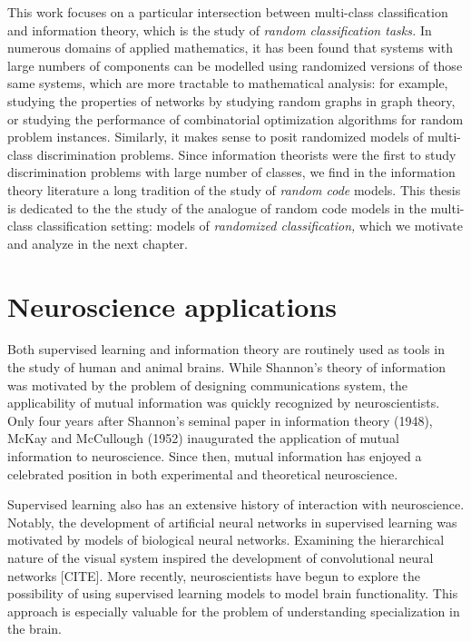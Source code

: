 This work focuses on a particular intersection between multi-class
classification and information theory, which is the study of
\emph{random classification tasks.}  In numerous domains of applied
mathematics, it has been found that systems with large numbers of
components can be modelled using randomized versions of those same
systems, which are more tractable to mathematical analysis: for
example, studying the properties of networks by studying random graphs
in graph theory, or studying the performance of combinatorial
optimization algorithms for random problem instances.  Similarly, it
makes sense to posit randomized models of multi-class discrimination
problems.  Since information theorists were the first to study
discrimination problems with large number of classes, we find in the
information theory literature a long tradition of the study of
\emph{random code} models.  This thesis is dedicated to the the study
of the analogue of random code models in the multi-class
classification setting: models of \emph{randomized classification,}
which we motivate and analyze in the next chapter.




\section{Neuroscience applications}

Both supervised learning and information theory are routinely used as
tools in the study of human and animal brains.  While Shannon's theory
of information was motivated by the problem of designing
communications system, the applicability of mutual information was
quickly recognized by neuroscientists.  Only four years after
Shannon's seminal paper in information theory (1948), McKay and
McCullough (1952) inaugurated the application of mutual information to
neuroscience. Since then, mutual information has enjoyed a celebrated
position in both experimental and theoretical neuroscience.

Supervised learning also has an extensive history of interaction with
neuroscience.  Notably, the development of artificial neural networks
in supervised learning was motivated by models of biological neural
networks.  Examining the hierarchical nature of the visual system
inspired the development of convolutional neural networks [CITE].
More recently, neuroscientists have begun to explore the possibility
of using supervised learning models to model brain functionality.
This approach is especially valuable for the problem of understanding
specialization in the brain.

